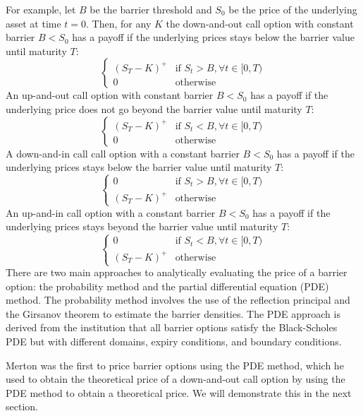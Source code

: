 For example, let $B$ be the barrier threshold and $S_0$ be the price of the underlying asset at time $t=0$. Then, for any $K$ the down-and-out call option with constant barrier $B<S_0$ has a payoff if the underlying prices stays below the barrier value until maturity $T$:
\begin{equation}
	\begin{cases}
	\left(S_T-K\right)^+  & \text{if }S_t>B,\forall t\in[0,T) \\
	0 & \text{otherwise}
	\end{cases}
\end{equation}
An up-and-out call option with constant barrier $B<S_0$ has a payoff if the underlying price does not go beyond the barrier value until maturity $T$:
\begin{equation}
	\begin{cases}
		\left(S_T-K\right)^+  & \text{if }S_t<B,\forall t\in[0,T) \\
		0 & \text{otherwise}
	\end{cases}
\end{equation}
A down-and-in call call option with a constant barrier $B<S_0$ has a payoff if the underlying prices stays below the barrier value until maturity $T$:
\begin{equation}
	\begin{cases}
		0 & \text{if }S_t>B,\forall t\in[0,T) \\
		\left(S_T-K\right)^+ & \text{otherwise}
	\end{cases}
\end{equation}
An up-and-in call option with a constant barrier $B<S_0$ has a payoff if the underlying prices stays beyond the barrier value until maturity $T$:
\begin{equation}
	\begin{cases}
		0 & \text{if }S_t<B,\forall t\in[0,T) \\
		\left(S_T-K\right)^+ & \text{otherwise}
	\end{cases}
\end{equation}
There are two main approaches to analytically evaluating the price of a barrier option: the probability method and the partial differential equation (PDE) method. The probability method involves the use of the reflection principal and the Girsanov theorem to estimate the barrier densities. The PDE approach is derived from the institution that all barrier options satisfy the Black-Scholes PDE but with different domains, expiry conditions, and boundary conditions.

Merton was the first to price barrier options using the PDE method, which he used to obtain the theoretical price of a down-and-out call option by using the PDE method to obtain a theoretical price. We will demonstrate this in the next section.